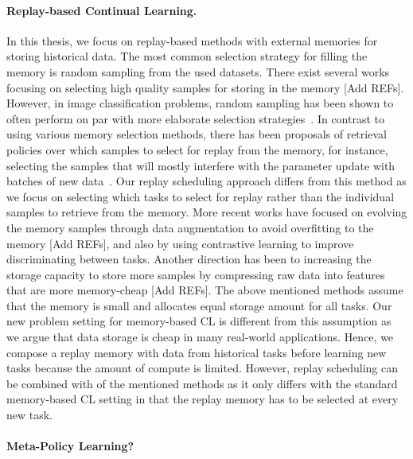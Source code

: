 \paragraph{Replay-based Continual Learning.} In this thesis, we focus on replay-based methods with external memories for storing historical data. The most common selection strategy for filling the memory is random sampling from the used datasets. There exist several works focusing on selecting high quality samples for storing in the memory [Add REFs]. However, in image classification problems, random sampling has been shown to often perform on par with more elaborate selection strategies~\cite{chaudhry2018riemannian, hayes2020remind}. In contrast to using various memory selection methods, there has been proposals of retrieval policies over which samples to select for replay from the memory, for instance, selecting the samples that will mostly interfere with the parameter update with batches of new data~\cite{aljundi2019online}. Our replay scheduling approach differs from this method as we focus on selecting which tasks to select for replay rather than the individual samples to retrieve from the memory.  
More recent works have focused on evolving the memory samples through data augmentation to avoid overfitting to the memory [Add REFs], and also by using contrastive learning to improve discriminating between tasks. Another direction has been to increasing the storage capacity to store more samples by compressing raw data into features that are more memory-cheap [Add REFs]. The above mentioned methods assume that the memory is small and allocates equal storage amount for all tasks. Our new problem setting for memory-based CL is different from this assumption as we argue that data storage is cheap in many real-world applications. Hence, we compose a replay memory with data from historical tasks before learning new tasks because the amount of compute is limited. However, replay scheduling can be combined with of the mentioned methods as it only differs with the standard memory-based CL setting in that the replay memory has to be selected at every new task. 

\paragraph{Meta-Policy Learning?}

